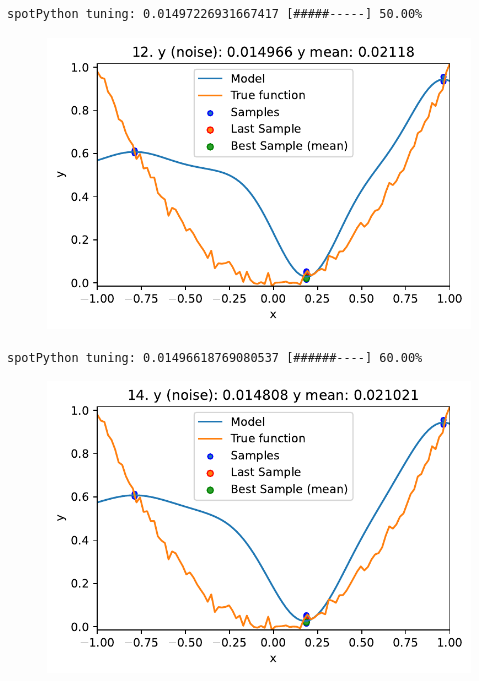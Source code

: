 \documentclass[
  letterpaper,
  DIV=11,
  numbers=noendperiod]{scrreprt}
\begin{document}
\begin{verbatim}
spotPython tuning: 0.01497226931667417 [#####-----] 50.00% 
\end{verbatim}

\begin{figure}[H]

{\centering \includegraphics{08_spot_noisy_files/figure-pdf/cell-6-output-6.pdf}

}

\end{figure}

\begin{verbatim}
spotPython tuning: 0.01496618769080537 [######----] 60.00% 
\end{verbatim}

\begin{figure}[H]

{\centering \includegraphics{08_spot_noisy_files/figure-pdf/cell-6-output-8.pdf}

}

\end{figure}
\end{document}
